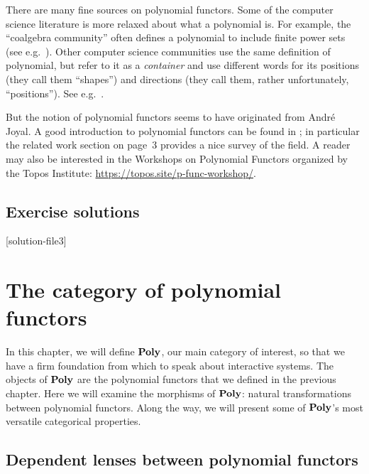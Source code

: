 \documentclass[Book-Poly]{subfiles}
\begin{document}
There are many fine sources on polynomial functors. Some of the computer science literature is more relaxed about what a polynomial is. For example, the ``coalgebra community'' often defines a polynomial to include finite power sets (see e.g.\ \cite{jacobs2017introduction}). Other computer science communities use the same definition of polynomial, but refer to it as a \emph{container} and use different words for its positions (they call them ``shapes'') and directions (they call them, rather unfortunately, ``positions''). See e.g.\ \cite{abbot2003categoriesthesis,abbott2005containers}.

But the notion of polynomial functors seems to have originated from Andr\'{e} Joyal. A good introduction to polynomial functors can be found in \cite{kock2012polynomial}; in particular the related work section on page~3 provides a nice survey of the field. A reader may also be interested in the Workshops on Polynomial Functors organized by the Topos Institute: \url{https://topos.site/p-func-workshop/}.

\section{Exercise solutions}
{\footnotesize
    }

[solution-file3]

\chapter{The category of polynomial functors} \label{ch.poly.cat}


In this chapter, we will define $\mathbf{Poly}$, our main category of interest, so that we have a firm foundation from which to speak about interactive systems.
The objects of $\mathbf{Poly}$ are the polynomial functors that we defined in the previous chapter.
Here we will examine the morphisms of $\mathbf{Poly}$: natural transformations between polynomial functors.
Along the way, we will present some of $\mathbf{Poly}$'s most versatile categorical properties.

\section{Dependent lenses between polynomial functors}
\label{sec.poly.cat.morph}
\end{document}
